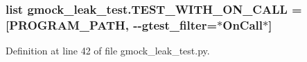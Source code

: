 \subsubsection[{\texorpdfstring{T\+E\+S\+T\+\_\+\+W\+I\+T\+H\+\_\+\+O\+N\+\_\+\+C\+A\+LL}{TEST_WITH_ON_CALL}}]{\setlength{\rightskip}{0pt plus 5cm}list gmock\+\_\+leak\+\_\+test.\+T\+E\+S\+T\+\_\+\+W\+I\+T\+H\+\_\+\+O\+N\+\_\+\+C\+A\+LL = \mbox{[}{\bf P\+R\+O\+G\+R\+A\+M\+\_\+\+P\+A\+TH}, \textquotesingle{}-\/-\/gtest\+\_\+filter=$\ast$On\+Call$\ast$\textquotesingle{}\mbox{]}}\hypertarget{namespacegmock__leak__test_a5b7e5890b4022a37ef82bdf4eb22ef44}{}\label{namespacegmock__leak__test_a5b7e5890b4022a37ef82bdf4eb22ef44}


Definition at line 42 of file gmock\+\_\+leak\+\_\+test.\+py.

